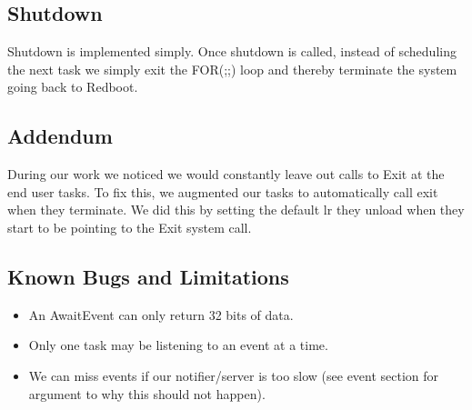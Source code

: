 \documentclass{article}
\begin{document}
\subsection{Shutdown}

Shutdown is implemented simply. Once shutdown is called, instead of scheduling the next task we simply exit the FOR(;;) loop and thereby terminate the system going back to Redboot.

\subsection{Addendum}

During our work we noticed we would constantly leave out calls to Exit at the end user tasks. To fix this, we augmented our tasks to automatically call exit when they terminate. We did this by setting the default lr they unload when they start to be pointing to the Exit system call.

\subsection{Known Bugs and Limitations}
\begin{itemize}
    \item An AwaitEvent can only return 32 bits of data.
    \item Only one task may be listening to an event at a time.
    \item We can miss events if our notifier/server is too slow (see event section for argument to why this should not happen).
\end{itemize}
\end{document}
